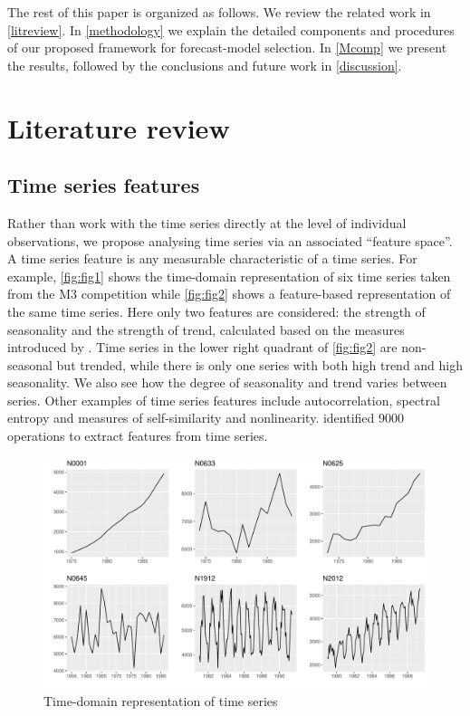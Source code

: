 \documentclass[11pt,a4paper,]{article}
\begin{document}
The rest of this paper is organized as follows. We review the related
work in \autoref{litreview}. In \autoref{methodology} we explain the
detailed components and procedures of our proposed framework for
forecast-model selection. In \autoref{Mcomp} we present the results,
followed by the conclusions and future work in \autoref{discussion}.

\section{Literature review}\label{litreview}

\subsection{Time series features}\label{time-series-features}

Rather than work with the time series directly at the level of
individual observations, we propose analysing time series via an
associated ``feature space''. A time series feature is any measurable
characteristic of a time series. For example, \autoref{fig:fig1} shows
the time-domain representation of six time series taken from the M3
competition \autocite{makridakis2000m3} while \autoref{fig:fig2} shows a
feature-based representation of the same time series. Here only two
features are considered: the strength of seasonality and the strength of
trend, calculated based on the measures introduced by
\textcite{wang2009rule}. Time series in the lower right quadrant of
\autoref{fig:fig2} are non-seasonal but trended, while there is only one
series with both high trend and high seasonality. We also see how the
degree of seasonality and trend varies between series. Other examples of
time series features include autocorrelation, spectral entropy and
measures of self-similarity and nonlinearity.
\textcite{fulcher2014highly} identified 9000 operations to extract
features from time series.

\begin{figure}

{\centering \includegraphics[width=\textwidth]{figure/fig1-1} 

}

\caption{Time-domain representation of time series}\label{fig:fig1}
\end{figure}
\end{document}
